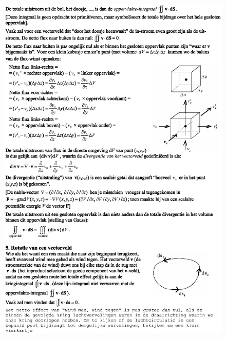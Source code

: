 \begin{figure}[ht]

\includegraphics[width=1.0\textwidth]{oefeningen.pictures/Div&Rot-1b}
\end{figure}
\newpage
